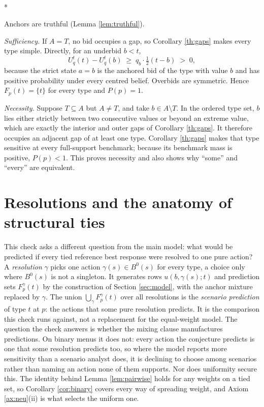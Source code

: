 \documentclass[12pt]{article}
\makeatletter
\theoremstyle{definition}
\renewenvironment{proof}[1][\proofname]{\par
  \pushQED{\qed}%
  \normalfont \topsep6\p@\@plus6\p@\relax
  \trivlist
  \item[\hskip\labelsep\itshape #1\@addpunct{.}]\mbox{}\\*
  \ignorespaces
}{%
  \popQED\endtrivlist\@endpefalse
}
\makeatother
\begin{document}
\begin{proof}[Proof of Corollary \ref{cor:align}]
Anchors are truthful (Lemma \ref{lem:truthful}).

\emph{Sufficiency.} If $A = T$, no bid occupies a gap, so Corollary \ref{th:gaps} makes every type simple. Directly, for an underbid $b < t$,
\[
U^t_q(t) - U^t_q(b) \;\ge\; q_b \cdot \tfrac12 (t - b) \;>\; 0,
\]
because the strict state $a = b$ is the anchored bid of the type with value $b$ and has positive probability under every centred belief. Overbids are symmetric. Hence $F_p(t) = \{t\}$ for every type and $P(p) = 1$.

\emph{Necessity.} Suppose $T \subseteq A$ but $A \neq T$, and take $b \in A \setminus T$. In the ordered type set, $b$ lies either strictly between two consecutive values or beyond an extreme value, which are exactly the interior and outer gaps of Corollary \ref{th:gaps}. It therefore occupies an adjacent gap of at least one type. Corollary \ref{th:gaps} makes that type sensitive at every full-support benchmark; because its benchmark mass is positive, $P(p) < 1$. This proves necessity and also shows why ``some'' and ``every'' are equivalent.
\end{proof}

\section{Resolutions and the anatomy of structural ties}\label{app:resolutions}

This check asks a different question from the main model: what would be predicted if every tied reference best response were resolved to one pure action? A \emph{resolution} $\gamma$ picks one action $\gamma(s) \in B^0(s)$ for every type, a choice only where $B^0(s)$ is not a singleton. It generates rows $u(b, \gamma(s); t)$ and prediction sets $F^{\gamma}_p(t)$ by the construction of Section \ref{sec:model}, with the anchor mixture replaced by $\gamma$. The union $\bigcup_{\gamma} F^{\gamma}_p(t)$ over all resolutions is the \emph{scenario prediction} of type $t$ at $p$: the actions that some pure resolution predicts. It is the comparison this check runs against, not a replacement for the equal-weight model. The question the check answers is whether the mixing clause manufactures predictions. On binary menus it does not: every action the conjecture predicts is one that some resolution predicts too, so where the model reports more sensitivity than a scenario analyst does, it is declining to choose among scenarios rather than naming an action none of them supports. Nor does uniformity secure this. The identity behind Lemma \ref{lem:pairwise} holds for any weights on a tied set, so Corollary \ref{cor:binary} covers every way of spreading weight, and Axiom \ref{ax:neu}(ii) is what selects the uniform one.
\end{document}
